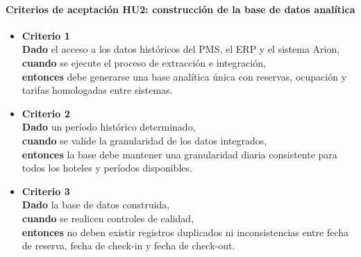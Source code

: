 \documentclass[
11pt, %
]{charter}
\begin{document}
\paragraph{Criterios de aceptación HU2: construcción de la base de datos analítica}
\begin{itemize}
  \item \textbf{Criterio 1} \\
  \textbf{Dado} el acceso a los datos históricos del PMS, el ERP y el sistema Arion, \\
  \textbf{cuando} se ejecute el proceso de extracción e integración, \\
  \textbf{entonces} debe generarse una base analítica única con reservas, ocupación y tarifas homologadas entre sistemas.

  \item \textbf{Criterio 2} \\
  \textbf{Dado} un período histórico determinado, \\
  \textbf{cuando} se valide la granularidad de los datos integrados, \\
  \textbf{entonces} la base debe mantener una granularidad diaria consistente para todos los hoteles y períodos disponibles.

  \item \textbf{Criterio 3} \\
  \textbf{Dado} la base de datos construida, \\
  \textbf{cuando} se realicen controles de calidad, \\
  \textbf{entonces} no deben existir registros duplicados ni inconsistencias entre fecha de reserva, fecha de check-in y fecha de check-out.
\end{itemize}

\vspace{1em}
\end{document}
